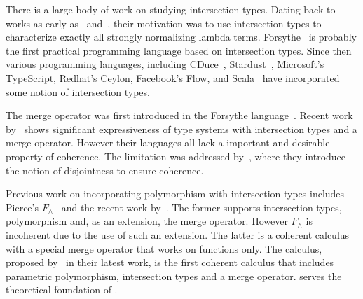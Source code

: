 There is a large body of work on studying intersection types. Dating back to
works as early as~\citet{coppo1981functional} and~\citet{pottinger1980type},
their motivation was to use intersection types to characterize exactly all
strongly normalizing lambda terms. Forsythe~\cite{reynolds1997design} is
probably the first practical programming language based on intersection types.
Since then various programming languages, including
CDuce~\cite{benzaken2003cduce}, Stardust~\cite{Dunfield07:Stardust}, Microsoft's
TypeScript, Redhat's Ceylon, Facebook's Flow, and Scala~\cite{scala-overview}
have incorporated some notion of intersection types.

The merge operator was first introduced in the Forsythe
language~\cite{reynolds1997design}. Recent work
by~\citet{dunfield2014elaborating} shows significant expressiveness of type
systems with intersection types and a merge operator. However their languages
all lack a important and desirable property of coherence. The limitation was
addressed by~\citet{oliveira2016disjoint}, where they introduce the notion of
disjointness to ensure coherence.

Previous work on incorporating polymorphism with intersection types includes
Pierce's $F_\wedge$~\cite{pierce1991programming2} and the recent work
by~\citet{Castagna:2014}. The former supports intersection types, polymorphism
and, as an extension, the merge operator. However $F_\wedge$ is incoherent due
to the use of such an extension. The latter is a coherent calculus with a
special merge operator that works on functions only. The \bname calculus,
proposed by~\citet{alpuimdisjoint} in their latest work, is the first coherent
calculus that includes parametric polymorphism, intersection types and a merge
operator. \bname serves the theoretical foundation of \name.





